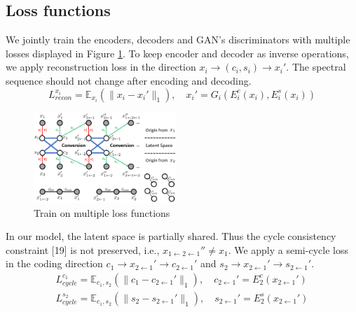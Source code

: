 \documentclass{article}
\begin{document}
\subsection{Loss functions}
We jointly train the encoders, decoders and GAN's discriminators with multiple losses displayed in Figure \ref{loss}. To keep encoder and decoder as inverse operations, we apply reconstruction loss in the direction $x_i \rightarrow (c_i, s_i) \rightarrow x_i'$. The spectral sequence should not change after encoding and decoding.
\begin{equation}
L_{recon}^{x_i} = \mathbb{E}_{x_i}(\| x_i - x_i' \|_1), \quad x_i' = G_i(E_i^c(x_i), E_i^s(x_i))
\end{equation}

\begin{figure}[htb]
\includegraphics[width=0.48\textwidth]{FIG/loss}
\caption{Train on multiple loss functions}
\label{loss}
\end{figure}

In our model, the latent space is partially shared. Thus the cycle consistency constraint [19] is not preserved, i.e., $x_{1\leftarrow2\leftarrow1}'' \neq x_1$. We apply a semi-cycle loss in the coding direction $c_1 \rightarrow x_{2\leftarrow1}' \rightarrow c_{2\leftarrow1}'$ and $s_2 \rightarrow x_{2\leftarrow1}' \rightarrow s_{2\leftarrow1}'$.
\begin{equation}
\begin{aligned}
L_{cycle}^{c_1} = \mathbb{E}_{c_1, s_2} (\| c_1 - c_{2\leftarrow1}' \|_1), \quad c_{2\leftarrow1}'=E_2^c(x_{2\leftarrow1}') \\
L_{cycle}^{s_2} = \mathbb{E}_{c_1, s_2} (\| s_2 - s_{2\leftarrow1}' \|_1), \quad s_{2\leftarrow1}'=E_2^s(x_{2\leftarrow1}')
\end{aligned}
\end{equation}
\end{document}
